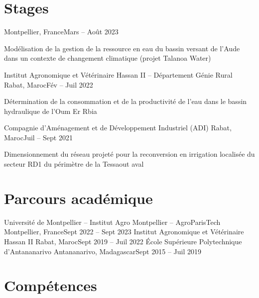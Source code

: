 \documentclass[10pt, a4paper]{article}
\begin{document}
\section{Stages}
%
  {Montpellier, France}{Mars -- Août 2023}
\begin{cvpoints}
  \item Modélisation de la gestion de la ressource en eau du bassin versant de
  l'Aude dans un contexte de changement climatique (projet Talanoa Water)
\end{cvpoints}
%
  {Institut Agronomique et Vétérinaire Hassan II -- Département Génie Rural}%
  {Rabat, Maroc}{Fév -- Juil 2022}
\begin{cvpoints}
  \item Détermination de la consommation et de la productivité de l'eau dans le
  bassin hydraulique de l'Oum Er Rbia
\end{cvpoints}
%
  {Compagnie d'Aménagement et de Développement Industriel (ADI)}%
  {Rabat, Maroc}{Juil -- Sept 2021}
\begin{cvpoints}
  \item Dimensionnement du réseau projeté pour la reconversion en irrigation
  localisée du secteur RD1 du périmètre de la Tessaout aval
\end{cvpoints}

\section{Parcours académique}
%
  {Université de Montpellier -- Institut Agro Montpellier -- AgroParisTech}%
  {Montpellier, France}{Sept 2022 -- Sept 2023}
%
  {Institut Agronomique et Vétérinaire Hassan II}%
  {Rabat, Maroc}{Sept 2019 -- Juil 2022}
%
  {École Supérieure Polytechnique d'Antananarivo}%
  {Antananarivo, Madagascar}{Sept 2015 -- Juil 2019}

\section{Compétences}
\end{document}
